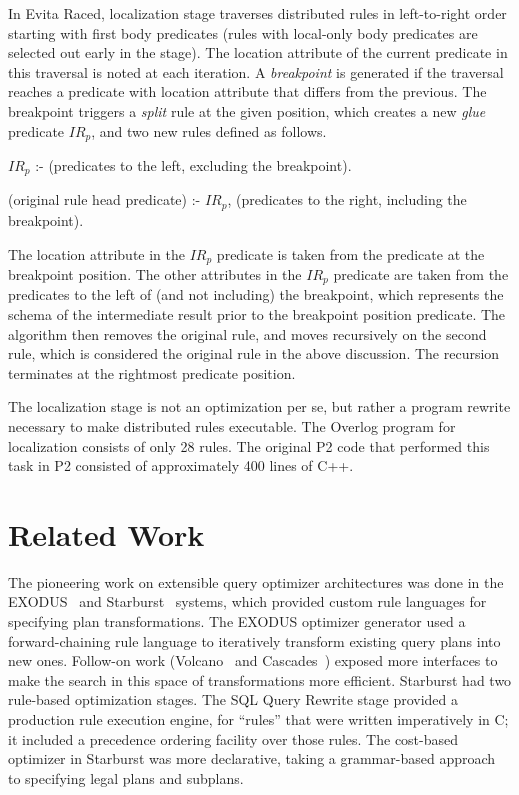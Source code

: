 In Evita Raced, localization stage traverses distributed rules in
left-to-right order starting with first body predicates (rules with
local-only body predicates are selected out early in the stage). 
The location attribute of the current predicate in this traversal is noted at each iteration.
A {\em breakpoint} is generated if the traversal reaches a predicate with location attribute 
that differs from the previous. The breakpoint triggers a {\em split} rule at the given 
position, which creates a new {\em glue} predicate $IR_p$, and two new rules defined as follows.
\begin{CompactEnumerate}
\item $IR_p$ :- (predicates to the left, excluding the breakpoint).
\item (original rule head predicate) :- $IR_p$, (predicates to the right, including the breakpoint). 
\end{CompactEnumerate}
The location attribute in the $IR_p$ predicate is taken from the predicate at the breakpoint position.
The other attributes in the $IR_p$ predicate are taken from the predicates to the left of (and not 
including) the breakpoint, which represents the schema of the intermediate result prior to the
breakpoint position predicate. The algorithm then removes the original rule, and moves recursively on
the second rule, which is considered the original rule in the above discussion. 
The recursion terminates at the rightmost predicate position. 

The localization stage is not an optimization per se, but rather a  program rewrite necessary to make distributed rules executable. 
The Overlog program for localization consists of only 28 rules. The original P2
code that performed this task in P2 consisted of approximately 400 lines of
C++.  








\section{Related Work}
The pioneering work on extensible query optimizer architectures was done in the EXODUS~\cite{exodus} and Starburst~\cite{lohman,phh92} systems, which provided custom rule languages for specifying plan transformations.  The EXODUS optimizer generator used a forward-chaining rule language to iteratively transform existing query plans into new ones. Follow-on work (Volcano~\cite{volcano} and Cascades~\cite{cascades}) exposed more interfaces to make the search in this space of transformations more efficient.  Starburst had two rule-based optimization stages.  The SQL Query Rewrite stage provided a production rule execution engine, for ``rules'' that were written imperatively in C; it included a precedence ordering facility over those rules.  The cost-based optimizer in Starburst was more declarative, taking a grammar-based approach to specifying legal plans and subplans.

